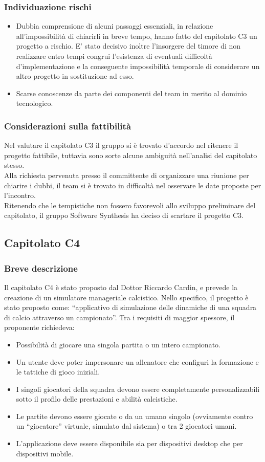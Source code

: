 \subsubsection{Individuazione rischi}
\begin{itemize}
	\item Dubbia comprensione di alcuni passaggi essenziali, in relazione all'impossibilità di chiarirli in breve tempo, hanno fatto del capitolato C3 un progetto a rischio. 
E' stato decisivo inoltre l'insorgere del timore di non realizzare entro tempi congrui l'esistenza di eventuali difficoltà d'implementazione e la conseguente impossibilità temporale di considerare un altro progetto in sostituzione ad esso.
	\item Scarse conoscenze da parte dei componenti del team in merito al dominio tecnologico.
\end{itemize}

\subsubsection{Considerazioni sulla fattibilità}
Nel valutare il capitolato C3 il gruppo si è trovato d'accordo nel ritenere il progetto fattibile, tuttavia sono sorte alcune ambiguità nell'analisi del capitolato stesso.\\ Alla richiesta pervenuta presso il committente di organizzare una riunione per chiarire i dubbi, il team si è trovato in difficoltà nel osservare le date proposte per l'incontro. \\Ritenendo che le tempistiche non fossero favorevoli allo sviluppo preliminare del capitolato, il gruppo Software Synthesis ha deciso di scartare il progetto C3.

\subsection{Capitolato C4}
\subsubsection{Breve descrizione}
Il capitolato C4 è stato proposto dal Dottor Riccardo Cardin, e prevede la creazione di un simulatore manageriale calcistico. Nello specifico, il progetto è stato proposto come: ``applicativo di simulazione delle dinamiche di una squadra di calcio attraverso un campionato''. Tra i requisiti di maggior spessore, il proponente richiedeva:
\begin{itemize}
	\item Possibilità di giocare una singola partita o un intero campionato.
	\item Un utente deve poter impersonare un allenatore che configuri la formazione e le tattiche di gioco iniziali.
	\item I singoli giocatori della squadra devono essere completamente personalizzabili sotto il profilo delle prestazioni e abilità calcistiche.
	\item Le partite devono essere giocate o da un umano singolo (ovviamente contro un ``giocatore'' virtuale, simulato dal sistema) o tra 2 giocatori umani.
	\item L'applicazione deve essere disponibile sia per dispositivi desktop che per dispositivi mobile.
\end{itemize}
